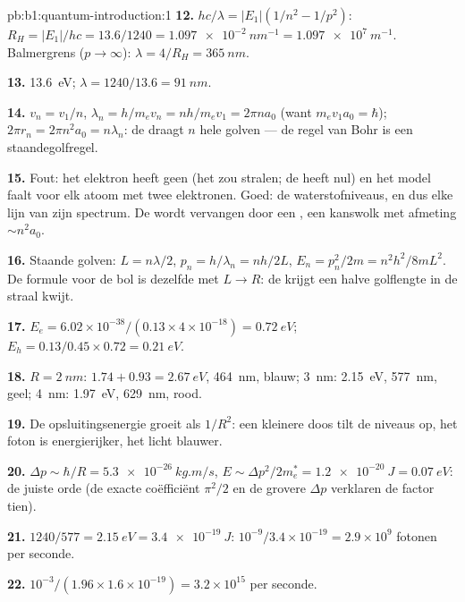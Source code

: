 \begin{solution}{pb:b1:quantum-introduction:1}
\textbf{12.} $hc/\lambda = |E_1|(1/n^2 - 1/p^2)$: $R_H = |E_1|/hc = 13.6/1240 =
\qty{1.097e-2}{nm^{-1}} = \qty{1.097e7}{m^{-1}}$. Balmergrens ($p \to \infty$):
$\lambda = 4/R_H = \qty{365}{nm}$.

\textbf{13.} \qty{13.6}{eV}; $\lambda = 1240/13.6 = \qty{91}{nm}$.

\textbf{14.} $v_n = v_1/n$, $\lambda_n = h/m_ev_n = nh/m_ev_1 = 2\pi na_0$ (want $m_ev_1a_0
= \hbar$); $2\pi r_n = 2\pi n^2a_0 = n\lambda_n$: de  draagt $n$ hele
golven --- de regel van Bohr is een staandegolfregel.

\textbf{15.} Fout: het elektron heeft geen  (het zou stralen; de
 heeft  nul) en het model faalt voor elk atoom
met twee elektronen. Goed: de waterstofniveaus, en dus elke lijn van zijn
spectrum. De  wordt vervangen door een , een kanswolk
met afmeting $\sim n^2a_0$.

\textbf{16.} Staande golven: $L = n\lambda/2$, $p_n = h/\lambda_n = nh/2L$, $E_n =
p_n^2/2m = n^2h^2/8mL^2$. De formule voor de bol is dezelfde met $L \to R$:
de  krijgt een halve golflengte in de straal kwijt.

\textbf{17.} $E_e = 6.02 \times 10^{-38}/(0.13 \times 4 \times 10^{-18}) = \qty{0.72}{eV}$;
$E_h = 0.13/0.45 \times 0.72 = \qty{0.21}{eV}$.

\textbf{18.} $R = \qty{2}{nm}$: $1.74 + 0.93 = \qty{2.67}{eV}$, \qty{464}{nm}, blauw;
\qty{3}{nm}: \qty{2.15}{eV}, \qty{577}{nm}, geel; \qty{4}{nm}: \qty{1.97}{eV},
\qty{629}{nm}, rood.

\textbf{19.} De opsluitingsenergie groeit als $1/R^2$: een kleinere doos tilt
de niveaus op, het foton is energierijker, het licht blauwer.

\textbf{20.} $\Delta p \sim \hbar/R = \qty{5.3e-26}{kg.m/s}$, $E \sim \Delta p^2/2m_e^\ast =
\qty{1.2e-20}{J} = \qty{0.07}{eV}$: de juiste orde (de exacte coëfficiënt
$\pi^2/2$ en de grovere $\Delta p$ verklaren de factor tien).

\textbf{21.} $1240/577 = \qty{2.15}{eV} = \qty{3.4e-19}{J}$: $10^{-9}/3.4 \times 10^{-19}
= 2.9 \times 10^9$ fotonen per seconde.

\textbf{22.} $10^{-3}/(1.96 \times 1.6 \times 10^{-19}) = 3.2 \times 10^{15}$ per seconde.


\end{solution}
